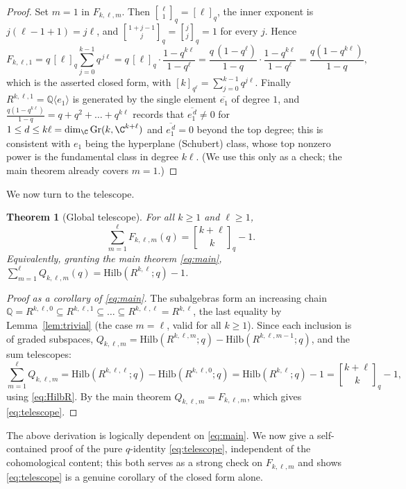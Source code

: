 \documentclass{amsart}
\newtheorem{theorem}{Theorem}
\theoremstyle{definition}
\newcommand{\Gr}{\mathrm{Gr}}
\newcommand{\Hilb}{\mathrm{Hilb}}
\newcommand{\qbin}[2]{\genfrac{[}{]}{0pt}{}{#1}{#2}_q}
\newcommand{\Q}{\mathbb{Q}}
\newcommand{\rkl}{R^{k,\ell}}
\newcommand{\Rklm}{R^{k,\ell,m}}
\begin{document}
\begin{proof}
Set $m=1$ in $F_{k,\ell,m}$. Then $\qbin{\ell}{1}=[\ell]_q$, the inner exponent is
$j(\ell-1+1)=j\ell$, and $\qbin{1+j-1}{j}=\qbin{j}{j}=1$ for every $j$. Hence
\[
F_{k,\ell,1}=q\,[\ell]_q\sum_{j=0}^{k-1}q^{\,j\ell}
=q\,[\ell]_q\cdot\frac{1-q^{k\ell}}{1-q^{\ell}}
=\frac{q\,(1-q^{\ell})}{1-q}\cdot\frac{1-q^{k\ell}}{1-q^{\ell}}
=\frac{q(1-q^{k\ell})}{1-q},
\]
which is the asserted closed form, with $[k]_{q^{\ell}}=\sum_{j=0}^{k-1}q^{j\ell}$.
Finally $R^{k,\ell,1}=\Q\langle e_1\rangle$ is generated by the single element
$\overline{e_1}$ of degree $1$, and $\frac{q(1-q^{k\ell})}{1-q}=q+q^2+\dots+q^{k\ell}$
records that $\overline{e_1^{\,d}}\ne0$ for $1\le d\le k\ell=\dim_{\C}\Gr(k,\C^{k+\ell})$
and $\overline{e_1^{\,d}}=0$ beyond the top degree; this is consistent with $e_1$
being the hyperplane (Schubert) class, whose top nonzero power is the fundamental
class in degree $k\ell$. (We use this only as a check; the main theorem already
covers $m=1$.)
\end{proof}

We now turn to the telescope.

\begin{theorem}[Global telescope]\label{thm:telescope}
For all $k\ge1$ and $\ell\ge1$,
\begin{equation}\label{eq:telescope}
\sum_{m=1}^{\ell}F_{k,\ell,m}(q)=\qbin{k+\ell}{k}-1 .
\end{equation}
Equivalently, granting the main theorem \eqref{eq:main},
$\sum_{m=1}^{\ell}Q_{k,\ell,m}(q)=\Hilb(\rkl;q)-1$.
\end{theorem}

\begin{proof}[Proof as a corollary of \eqref{eq:main}]
The subalgebras form an increasing chain
$\Q=R^{k,\ell,0}\subseteq R^{k,\ell,1}\subseteq\dots\subseteq R^{k,\ell,\ell}=\rkl$,
the last equality by Lemma~\ref{lem:trivial} (the case $m=\ell$, valid for all
$k\ge1$). Since each inclusion is of graded subspaces,
$Q_{k,\ell,m}=\Hilb(\Rklm;q)-\Hilb(R^{k,\ell,m-1};q)$, and the sum telescopes:
\[
\sum_{m=1}^{\ell}Q_{k,\ell,m}
=\Hilb(R^{k,\ell,\ell};q)-\Hilb(R^{k,\ell,0};q)
=\Hilb(\rkl;q)-1=\qbin{k+\ell}{k}-1,
\]
using \eqref{eq:HilbR}. By the main theorem $Q_{k,\ell,m}=F_{k,\ell,m}$, which gives
\eqref{eq:telescope}.
\end{proof}

The above derivation is logically dependent on \eqref{eq:main}. We now give a
self-contained proof of the pure $q$-identity \eqref{eq:telescope}, independent of
the cohomological content; this both serves as a strong check on $F_{k,\ell,m}$ and
shows \eqref{eq:telescope} is a genuine corollary of the closed form alone.
\end{document}
